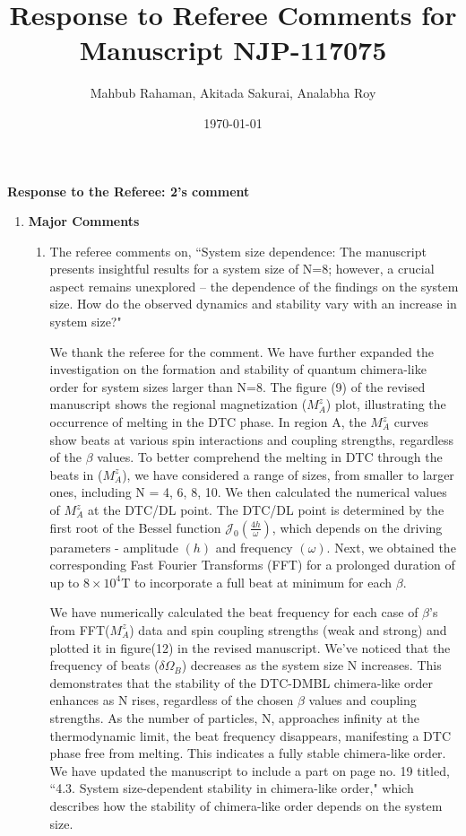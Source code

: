 \documentclass[aps,prb,reprint,showpacs,floatfix,superscriptaddress, onecolumn, nofootinbib, 10pt]{revtex4-2}
\newcommand{\response}[1]{{\color{black}#1}} %
\newcommand{\comment}[1]{{\color{blue}#1}} %
\begin{document}

\title{Response to Referee Comments for Manuscript NJP-117075}
\author{Mahbub Rahaman, Akitada Sakurai, Analabha Roy}
\date{\today}

\maketitle

\vspace{1em}

\noindent \textbf{Response to the Referee: 2's comment}
\begin{enumerate}
	\item {\bf Major Comments}
	\begin{enumerate}
		\item The referee comments on, \comment{``System size dependence: The manuscript presents insightful results for a system size
				of N=8; however, a crucial aspect remains unexplored – the dependence of the
				findings on the system size. How do the observed dynamics and stability vary with an
				increase in system size?"}\\
		
		\response{
			We thank the referee for the comment. We have further expanded the investigation on the formation and stability of quantum chimera-like order for system sizes larger than N=8. The figure (9) of the revised manuscript shows the regional magnetization ($M^z_A$) plot, illustrating the occurrence of melting in the DTC phase. In region A, the $M^z_A$ curves show beats at various spin interactions and coupling strengths, regardless of the $\beta$ values. To better comprehend the melting in DTC through the beats in ($M^z_A$), we have considered a range of sizes, from smaller to larger ones, including N = 4, 6, 8, 10. We then calculated the numerical values of $M^z_A$ at the DTC/DL point. The DTC/DL point is determined by the first root of the Bessel function $\mathcal{J}_0\left(\frac{4h}{\omega}\right)$, which depends on the driving parameters - amplitude $(h)$ and frequency $(\omega)$. Next, we obtained the corresponding Fast Fourier Transforms (FFT) for a prolonged duration of up to $8 \times 10^4$T to incorporate a full beat at minimum for each $\beta$. 		
			
			We have numerically calculated the beat frequency for each case of $\beta$'s from FFT($M^z_A$) data and spin coupling strengths (weak and strong) and plotted it in figure(12) in the revised manuscript. We've noticed that the frequency of beats ($\delta \Omega_B$) decreases as the system size N increases. This demonstrates that the stability of the DTC-DMBL chimera-like order enhances as N rises, regardless of the chosen $\beta$ values and coupling strengths. As the number of particles, N, approaches infinity at the thermodynamic limit, the beat frequency disappears, manifesting a DTC phase free from melting. This indicates a fully stable chimera-like order. We have updated the manuscript to include a part on page no. 19 titled, ``4.3. System size-dependent stability in chimera-like order," which describes how the stability of chimera-like order depends on the system size.
			
}
\end{enumerate}
\end{enumerate}
\end{document}
